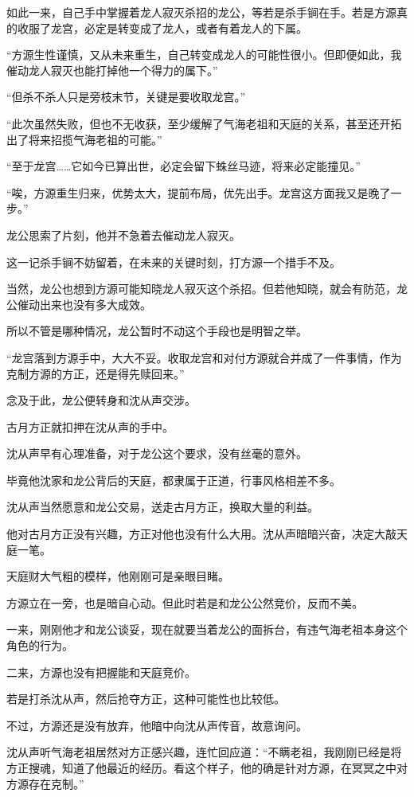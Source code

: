 \begin{this_body}
如此一来，自己手中掌握着龙人寂灭杀招的龙公，等若是杀手锏在手。若是方源真的收服了龙宫，必定是转变成了龙人，或者有着龙人的下属。

“方源生性谨慎，又从未来重生，自己转变成龙人的可能性很小。但即便如此，我催动龙人寂灭也能打掉他一个得力的属下。”

“但杀不杀人只是旁枝末节，关键是要收取龙宫。”

“此次虽然失败，但也不无收获，至少缓解了气海老祖和天庭的关系，甚至还开拓出了将来招揽气海老祖的可能。”

“至于龙宫……它如今已算出世，必定会留下蛛丝马迹，将来必定能撞见。”

“唉，方源重生归来，优势太大，提前布局，优先出手。龙宫这方面我又是晚了一步。”

龙公思索了片刻，他并不急着去催动龙人寂灭。

这一记杀手锏不妨留着，在未来的关键时刻，打方源一个措手不及。

当然，龙公也想到方源可能知晓龙人寂灭这个杀招。但若他知晓，就会有防范，龙公催动出来也没有多大成效。

所以不管是哪种情况，龙公暂时不动这个手段也是明智之举。

“龙宫落到方源手中，大大不妥。收取龙宫和对付方源就合并成了一件事情，作为克制方源的方正，还是得先赎回来。”

念及于此，龙公便转身和沈从声交涉。

古月方正就扣押在沈从声的手中。

沈从声早有心理准备，对于龙公这个要求，没有丝毫的意外。

毕竟他沈家和龙公背后的天庭，都隶属于正道，行事风格相差不多。

沈从声当然愿意和龙公交易，送走古月方正，换取大量的利益。

他对古月方正没有兴趣，方正对他也没有什么大用。沈从声暗暗兴奋，决定大敲天庭一笔。

天庭财大气粗的模样，他刚刚可是亲眼目睹。

方源立在一旁，也是暗自心动。但此时若是和龙公公然竞价，反而不美。

一来，刚刚他才和龙公谈妥，现在就要当着龙公的面拆台，有违气海老祖本身这个角色的行为。

二来，方源也没有把握能和天庭竞价。

若是打杀沈从声，然后抢夺方正，这种可能性也比较低。

不过，方源还是没有放弃，他暗中向沈从声传音，故意询问。

沈从声听气海老祖居然对方正感兴趣，连忙回应道：“不瞒老祖，我刚刚已经是将方正搜魂，知道了他最近的经历。看这个样子，他的确是针对方源，在冥冥之中对方源存在克制。”


\end{this_body}

